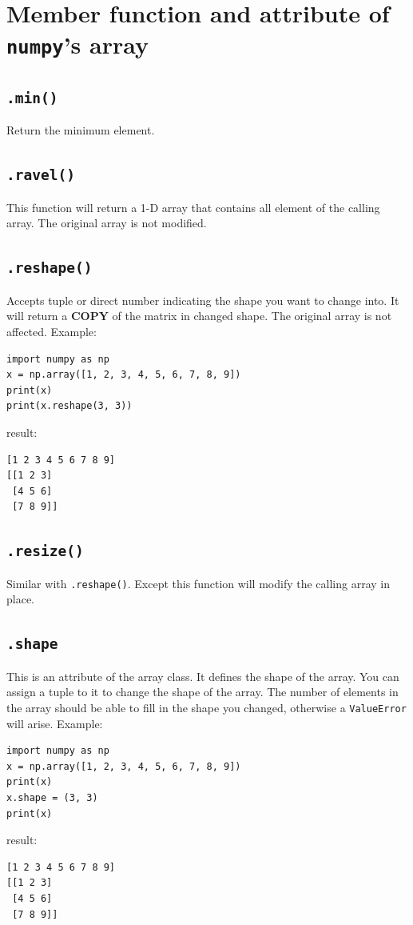 \documentclass[12pt]{book}
\begin{document}
\section{Member function and attribute  of \texttt{numpy}'s array}
\label{sec:orga2cfa51}
\subsection{\texttt{.min()}}
\label{sec:org629ea57}
Return the minimum element.
\subsection{\texttt{.ravel()}}
\label{sec:org033ea71}
This function will return a 1-D array that contains all element of the calling array. The original array is not modified.
\subsection{\texttt{.reshape()}}
\label{sec:org0100c49}
Accepts tuple or direct number indicating the shape you want to change into. It will return a \textbf{COPY} of the matrix in changed shape. The original array is not affected. Example:
\begin{verbatim}
import numpy as np
x = np.array([1, 2, 3, 4, 5, 6, 7, 8, 9])
print(x)
print(x.reshape(3, 3))
\end{verbatim}
result:
\begin{verbatim}
[1 2 3 4 5 6 7 8 9]
[[1 2 3]
 [4 5 6]
 [7 8 9]]
\end{verbatim}
\subsection{\texttt{.resize()}}
\label{sec:org44725b6}
Similar with \texttt{.reshape()}. Except this function will modify the calling array in place.
\subsection{\texttt{.shape}}
\label{sec:orgbf41f16}
This is an attribute of the array class. It defines the shape of the array. You can assign a tuple to it to change the shape of the array. The number of elements in the array should be able to fill in the shape you changed, otherwise a \texttt{ValueError} will arise. Example:
\begin{verbatim}
import numpy as np
x = np.array([1, 2, 3, 4, 5, 6, 7, 8, 9])
print(x)
x.shape = (3, 3)
print(x)
\end{verbatim}
result:
\begin{verbatim}
[1 2 3 4 5 6 7 8 9]
[[1 2 3]
 [4 5 6]
 [7 8 9]]
\end{verbatim}
\end{document}
